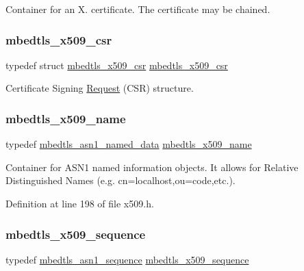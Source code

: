 Container for an X. certificate. The certificate may be chained. \mbox{\label{group__x509__module_gae481b23df67001bdac96ef9c2ab3ef7c}} 
\subsubsection{\texorpdfstring{mbedtls\+\_\+x509\+\_\+csr}{mbedtls\_x509\_csr}}
{\footnotesize\ttfamily typedef struct \mbox{\hyperlink{structmbedtls__x509__csr}{mbedtls\+\_\+x509\+\_\+csr}}
 \mbox{\hyperlink{structmbedtls__x509__csr}{mbedtls\+\_\+x509\+\_\+csr}}}

Certificate Signing \mbox{\hyperlink{struct_request}{Request}} (C\+SR) structure. \mbox{\label{group__x509__module_ga2272228c7776102328df31623af3168c}} 
\subsubsection{\texorpdfstring{mbedtls\+\_\+x509\+\_\+name}{mbedtls\_x509\_name}}
{\footnotesize\ttfamily typedef \mbox{\hyperlink{structmbedtls__asn1__named__data}{mbedtls\+\_\+asn1\+\_\+named\+\_\+data}} \mbox{\hyperlink{group__x509__module_ga2272228c7776102328df31623af3168c}{mbedtls\+\_\+x509\+\_\+name}}}

Container for A\+S\+N1 named information objects. It allows for Relative Distinguished Names (e.\+g. cn=localhost,ou=code,etc.). 

Definition at line 198 of file x509.\+h.

\mbox{\label{group__x509__module_gabd52d60a09315854d9ef849d02154f35}} 
\subsubsection{\texorpdfstring{mbedtls\+\_\+x509\+\_\+sequence}{mbedtls\_x509\_sequence}}
{\footnotesize\ttfamily typedef \mbox{\hyperlink{structmbedtls__asn1__sequence}{mbedtls\+\_\+asn1\+\_\+sequence}} \mbox{\hyperlink{group__x509__module_gabd52d60a09315854d9ef849d02154f35}{mbedtls\+\_\+x509\+\_\+sequence}}}


